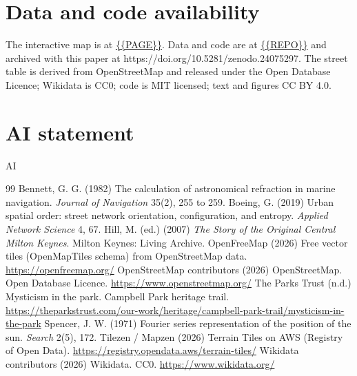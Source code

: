 \documentclass[11pt,a4paper]{article}
\begin{document}
\section*{Data and code availability}
The interactive map is at \url{{{PAGE}}}. Data and code are at \url{{{REPO}}} and archived with this paper at https://doi.org/10.5281/zenodo.24075297. The street table is derived from OpenStreetMap and released under the Open Database Licence; Wikidata is CC0; code is MIT licensed; text and figures CC BY 4.0.

\section*{AI statement}
{{AI}}

\begin{thebibliography}{99}
 Bennett, G. G. (1982) The calculation of astronomical refraction in marine navigation. \textit{Journal of Navigation} 35(2), 255 to 259.
 Boeing, G. (2019) Urban spatial order: street network orientation, configuration, and entropy. \textit{Applied Network Science} 4, 67.
 Hill, M. (ed.) (2007) \textit{The Story of the Original Central Milton Keynes}. Milton Keynes: Living Archive.
 OpenFreeMap (2026) Free vector tiles (OpenMapTiles schema) from OpenStreetMap data. \url{https://openfreemap.org/}
 OpenStreetMap contributors (2026) OpenStreetMap. Open Database Licence. \url{https://www.openstreetmap.org/}
 The Parks Trust (n.d.) Mysticism in the park. Campbell Park heritage trail. \url{https://theparkstrust.com/our-work/heritage/campbell-park-trail/mysticism-in-the-park}
 Spencer, J. W. (1971) Fourier series representation of the position of the sun. \textit{Search} 2(5), 172.
 Tilezen / Mapzen (2026) Terrain Tiles on AWS (Registry of Open Data). \url{https://registry.opendata.aws/terrain-tiles/}
 Wikidata contributors (2026) Wikidata. CC0. \url{https://www.wikidata.org/}
\end{thebibliography}
\end{document}
